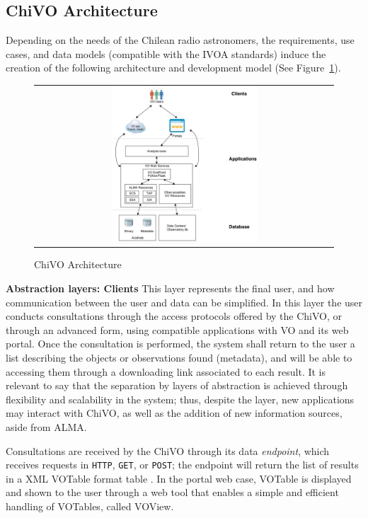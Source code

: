 \documentclass[]{spie}
\begin{document}
\subsection{ChiVO Architecture}
Depending on the needs of the Chilean radio astronomers, the requirements, use cases, and data models (compatible with the IVOA standards) induce the creation of the following architecture and development model (See Figure~\ref{fig:chivoarch}).

\begin{figure}
   \begin{center}
   \begin{tabular}{c}
   \includegraphics[width=0.5\textwidth]{images/chivo_capas.png}
   \end{tabular}
   \end{center}
   \caption[example]
   { \label{fig:chivoarch} ChiVO Architecture}
\end{figure}

\textbf{Abstraction layers:  Clients}
This layer represents the final user, and how communication between the user and data can be simplified.  In this layer the user conducts consultations through the access protocols offered by the ChiVO, or through an advanced form, using compatible applications with VO and its web portal.  Once the consultation is performed, the system shall return to the user a list describing the objects or observations found (metadata), and will be able to accessing them through a downloading link associated to each result.  It is relevant to say that the separation by layers of abstraction is achieved through flexibility and scalability in the system; thus, despite the layer, new applications may interact with ChiVO, as well as the addition of new information sources, aside from ALMA.

Consultations are received by the ChiVO through its data \emph{endpoint}, which receives requests in \texttt{HTTP}, \texttt{GET}, or \texttt{POST}; the endpoint will return the list of results in a XML VOTable format table \cite{ochsenbein2011ivoa}.  In the portal web case, VOTable is displayed and shown to the user through a web tool that enables a simple and efficient handling of VOTables, called VOView.
\end{document}
